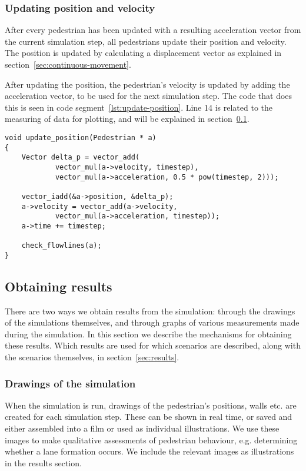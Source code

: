 \subsubsection{Updating position and velocity}
After every pedestrian has been updated with a resulting acceleration vector from 
the current simulation step, all pedestrians update their position and velocity.  
The position is updated by calculating a displacement vector as explained in 
section~\ref{sec:continuous-movement}.

After updating the position, the pedestrian's velocity is updated by adding 
the acceleration vector, to be used for the next simulation step. The code 
that does this is seen in code segment~\ref{lst:update-position}. Line 14 is 
related to the measuring of data for plotting, and will be explained in 
section~\ref{sec:measurement}.

\begin{lstlisting}[caption={Updating the pedestrian 
    position.},label=lst:update-position]
void update_position(Pedestrian * a)
{
	Vector delta_p = vector_add(
			vector_mul(a->velocity, timestep), 
			vector_mul(a->acceleration, 0.5 * pow(timestep, 2)));

    vector_iadd(&a->position, &delta_p);
	a->velocity = vector_add(a->velocity,
			vector_mul(a->acceleration, timestep));
    a->time += timestep;

    check_flowlines(a);
}
\end{lstlisting}

\subsection{Obtaining results}
\label{sec:measurement}
There are two ways we obtain results from the simulation: through the drawings 
of the simulations themselves, and through graphs of various measurements made 
during the simulation. In this section we describe the mechanisms for 
obtaining these results. Which results are used for which scenarios are 
described, along with the scenarios themselves, in section~\ref{sec:results}.

\subsubsection{Drawings of the simulation}
When the simulation is run, drawings of the pedestrian's positions, walls etc. are 
created for each simulation step. These can be shown in real time, or saved 
and either assembled into a film or used as individual illustrations. We use 
these images to make qualitative assessments of pedestrian behaviour, e.g. 
determining whether a lane formation occurs. We include the relevant images as 
illustrations in the results section.

